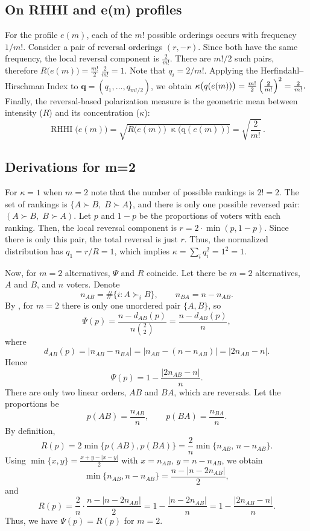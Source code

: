 \documentclass[12pt]{article}
\begin{document}
\subsection{On RHHI and e(m) profiles}
For the profile \( e(m) \), each of the \( m! \) possible orderings occurs with frequency \( 1/m! \). Consider a pair of reversal orderings \( (r, -r) \). Since both have the same frequency, the local reversal component is
\( \frac{2}{m!} \). There are \( m!/2 \) such pairs, therefore
\(R\bigl(e(m)\bigr)=\frac{m!}{2}\;\frac{2}{m!}=1.\) Note that $q_i = 2/m!$.
Applying the Herfindahl–Hirschman Index to $\mathbf q=(q_1,\dots,q_{m!/2})$, we
obtain
\( \operatorname{\kappa}\bigl(q(e(m))\bigr)=\frac{m!}{2}\, \Bigl(\tfrac{2}{m!}\Bigr)^2=\frac{2}{m!}. \)
Finally, the reversal-based polarization measure is the geometric mean between
intensity ($R$) and its concentration (\(\kappa\)):
\[
\operatorname{RHHI}\bigl(e(m)\bigr)=
\sqrt{R\bigl(e(m)\bigr)\;\operatorname{\kappa}\bigl(\text{q}(e(m))\bigr)}
=\sqrt{\frac{2}{m!}}\,.
\]



\subsection{Derivations for m=2}
\label{sec:appendixB}
For \(\kappa = 1\) when \(m=2\) note that the number of possible rankings is \(2! = 2\). The set of rankings is \(\{ A \succ B,\; B \succ A \}\), and there is only one possible reversed pair: \((A \succ B,\; B \succ A)\). Let \(p\) and \(1-p\) be the proportions of voters with each ranking. Then, the local reversal component is \(r = 2 \cdot \min(p, 1 - p)\). Since there is only this pair, the total reversal is just \(r\). Thus, the normalized distribution has \(q_1 = r/R = 1\), which implies \(\kappa = \sum_i q_i^2 = 1^2 = 1\).

Now, for \(m=2\) alternatives, \(\Psi\) and \(R\) coincide. Let there be \(m=2\) alternatives, \(A\) and \(B\), and \(n\) voters. Denote
\[
n_{AB}=\#\{i: A\succ_i B\},\qquad n_{BA}=n-n_{AB}.
\]
By \textcite{can2015measuring}, for \(m=2\) there is only one unordered pair \(\{A,B\}\), so
\[
\Psi(p)
= \frac{n - d_{AB}(p)}{n \binom{2}{2}}
= \frac{n - d_{AB}(p)}{n},
\]
where
\[
d_{AB}(p) = \big|n_{AB}-n_{BA}\big|
= \big|n_{AB} - (n-n_{AB})\big|
= \big| 2n_{AB} - n \big|.
\]
Hence
\[
\Psi(p) = 1 - \frac{|2n_{AB} - n|}{n}.
\]
There are only two linear orders, \(AB\) and \(BA\), which are reversals. Let the proportions be
\[
p(AB) = \frac{n_{AB}}{n}, \qquad p(BA) = \frac{n_{BA}}{n}.
\]
By definition,
\[
R(p) = 2\min\{p(AB), p(BA)\}
= \frac{2}{n} \min\{n_{AB},\, n - n_{AB}\}.
\]
Using \(\min\{x,y\} = \frac{x+y - |x-y|}{2}\) with \(x=n_{AB}\), \(y=n-n_{AB}\), we obtain
\[
\min\{n_{AB}, n-n_{AB}\}
= \frac{n - |n - 2n_{AB}|}{2},
\]
and
\[
R(p) = \frac{2}{n} \cdot \frac{n - |n - 2n_{AB}|}{2}
= 1 - \frac{|n - 2n_{AB}|}{n}
= 1 - \frac{|2n_{AB} - n|}{n}.
\]
Thus, we have \(\Psi(p) = R(p)\) for \(m=2\).
\end{document}
